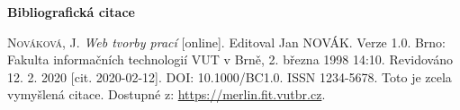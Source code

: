 \bigskip

\noindent \textbf{Bibliografická citace}

\medskip

\noindent \textsc{Nováková}, J. \textit{Web tvorby prací} [online]. Editoval Jan NOVÁK. Verze 1.0. Brno: Fakulta informačních technologií VUT v Brně, 2. března 1998 14:10. Revidováno 12. 2. 2020 [cit. 2020-02-12]. DOI: 10.1000/BC1.0. ISSN 1234-5678. Toto je zcela vymyšlená citace. Dostupné z: \url{https://merlin.fit.vutbr.cz}.

%
